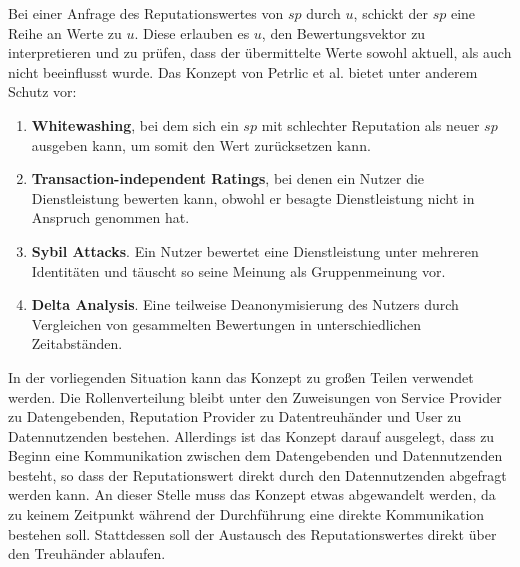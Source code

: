 \documentclass{scrreprt}
\begin{document}
Bei einer Anfrage des Reputationswertes von $sp$ durch $u$, schickt der $sp$ eine Reihe an Werte zu $u$. Diese erlauben es $u$, den Bewertungsvektor zu interpretieren und zu prüfen, dass der übermittelte Werte sowohl aktuell, als auch nicht beeinflusst wurde. 
Das Konzept von Petrlic et al. bietet unter anderem Schutz vor: 
\begin{enumerate}
    \item \textbf{Whitewashing}, bei dem sich ein $sp$ mit schlechter Reputation als neuer $sp$ ausgeben kann, um somit den Wert zurücksetzen kann.
    \item \textbf{Transaction-independent Ratings}, bei denen ein Nutzer die Dienstleistung bewerten kann, obwohl er besagte Dienstleistung nicht in Anspruch genommen hat.
    \item \textbf{Sybil Attacks}. Ein Nutzer bewertet eine Dienstleistung unter mehreren Identitäten und täuscht so seine Meinung als Gruppenmeinung vor.
    \item \textbf{Delta Analysis}. Eine teilweise Deanonymisierung des Nutzers durch Vergleichen von gesammelten Bewertungen in unterschiedlichen Zeitabständen.
\end{enumerate} 
In der vorliegenden Situation kann das Konzept zu großen Teilen verwendet werden. Die Rollenverteilung bleibt unter den Zuweisungen von Service Provider zu Datengebenden, Reputation Provider zu Datentreuhänder und User zu Datennutzenden bestehen. Allerdings ist das Konzept darauf ausgelegt, dass zu Beginn eine Kommunikation zwischen dem Datengebenden und Datennutzenden besteht, so dass der Reputationswert direkt durch den Datennutzenden abgefragt werden kann. An dieser Stelle muss das Konzept etwas abgewandelt werden, da zu keinem Zeitpunkt während der Durchführung eine direkte Kommunikation bestehen soll. Stattdessen soll der Austausch des Reputationswertes direkt über den Treuhänder ablaufen.
\end{document}

